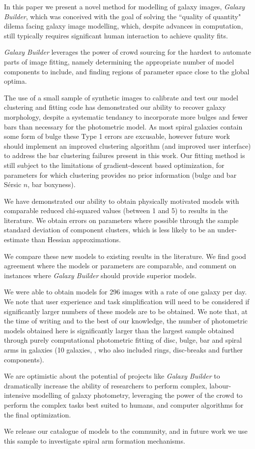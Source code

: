 \documentclass[../main.tex]{subfiles}
\begin{document}
\label{sec:conclusions}
In this paper we present a novel method for modelling of galaxy images, \textit{Galaxy Builder}, which was conceived with the goal of solving the ``quality of quantity" dilema facing galaxy image modelling, which, despite advances in computation, still typically requires significant human interaction to achieve quality fits.

\textit{Galaxy Builder} leverages the power of crowd sourcing for the hardest to automate parts of image fitting, namely determining the appropriate number of model components to include, and finding regions of parameter space close to the global optima.

The use of a small sample of synthetic images to calibrate and test our model clustering and fitting code has demonstrated our ability to recover galaxy morphology, despite a systematic tendancy to incorporate more bulges and fewer bars than necessary for the photometric model. As most spiral galaxies contain some form of bulge these Type 1 errors are excusable, however future work should implement an improved clustering algorithm (and improved user interface) to address the bar clustering failures present in this work. Our fitting method is still subject to the limitations of gradient-descent based optimization, for parameters for which clustering provides no prior information (bulge and bar S\'ersic $n$, bar boxyness).

We have demonstrated our ability to obtain physically motivated models with comparable reduced chi-squared values (between 1 and 5) to results in the literature. We obtain errors on parameters where possible through the sample standard deviation of component clusters, which is less likely to be an under-estimate than Hessian approximations.

We compare these new models to existing results in the literature. We find good agreement where the models or parameters are comparable, and comment on instances where \textit{Galaxy Builder} should provide superior models.

We were able to obtain models for 296 images with a rate of one galaxy per day. We note that user experience and task simplification will need to be considered if significantly larger numbers of these models are to be obtained. We note that, at the time of writing and to the best of our knowledge, the number of photometric models obtained here is significantly larger than the largest sample obtained through purely computational photometric fitting of disc, bulge, bar and spiral arms in galaxies (10 galaxies, \citealt{Gao2017:1709.00746v1}, who also included rings, disc-breaks and further components).

We are optimistic about the potential of projects like \textit{Galaxy Builder} to dramatically increase the ability of researchers to perform complex, labour-intensive modelling of galaxy photometry, leveraging the power of the crowd to perform the complex tasks best suited to humans, and computer algorithms for the final optimization.

We release our catalogue of models to the community, and in future work we use this sample to investigate spiral arm formation mechanisms.
\end{document}
